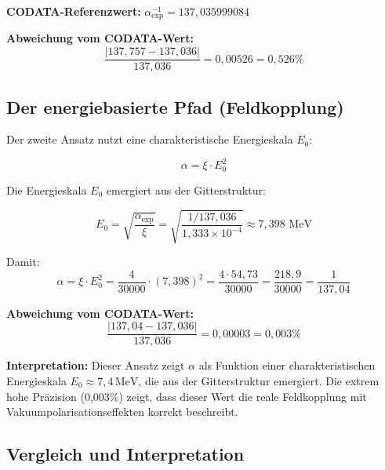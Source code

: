 	\textbf{CODATA-Referenzwert:} \(\alpha^{-1}_{\exp} = 137{,}035999084\)
	
	\textbf{Abweichung vom CODATA-Wert:}
	\begin{equation}
		\frac{|137{,}757 - 137{,}036|}{137{,}036} = 0{,}00526 = 0{,}526\%
	\end{equation}
	
	\subsection{Der energiebasierte Pfad (Feldkopplung)}
	
	Der zweite Ansatz nutzt eine charakteristische Energieskala \(E_0\):
	
	\begin{equation}
		\boxed{\alpha = \xi \cdot E_0^2}
	\end{equation}
	
	Die Energieskala \(E_0\) emergiert aus der Gitterstruktur:
	
	\begin{equation}
		E_0 = \sqrt{\frac{\alpha_{\exp}}{\xi}} = \sqrt{\frac{1/137{,}036}{1{,}333 \times 10^{-4}}} \approx 7{,}398 \text{ MeV}
	\end{equation}
	
	Damit:
	\begin{equation}
		\alpha = \xi \cdot E_0^2 = \frac{4}{30000} \cdot (7{,}398)^2 = \frac{4 \cdot 54{,}73}{30000} = \frac{218{,}9}{30000} = \frac{1}{137{,}04}
	\end{equation}
	
	\textbf{Abweichung vom CODATA-Wert:}
	\begin{equation}
		\frac{|137{,}04 - 137{,}036|}{137{,}036} = 0{,}00003 = 0{,}003\%
	\end{equation}
	
	\textbf{Interpretation:} Dieser Ansatz zeigt \(\alpha\) als Funktion einer charakteristischen Energieskala \(E_0 \approx 7{,}4\,\text{MeV}\), die aus der Gitterstruktur emergiert. Die extrem hohe Präzision (0{,}003\%) zeigt, dass dieser Wert die reale Feldkopplung mit Vakuumpolarisationseffekten korrekt beschreibt.
	
	\subsection{Vergleich und Interpretation}
	
	\begin{table}[h!]
		\centering
		\caption{Vergleich der beiden theoretischen T0-Ansätze mit dem experimentellen Wert.}
	\end{table}
	
